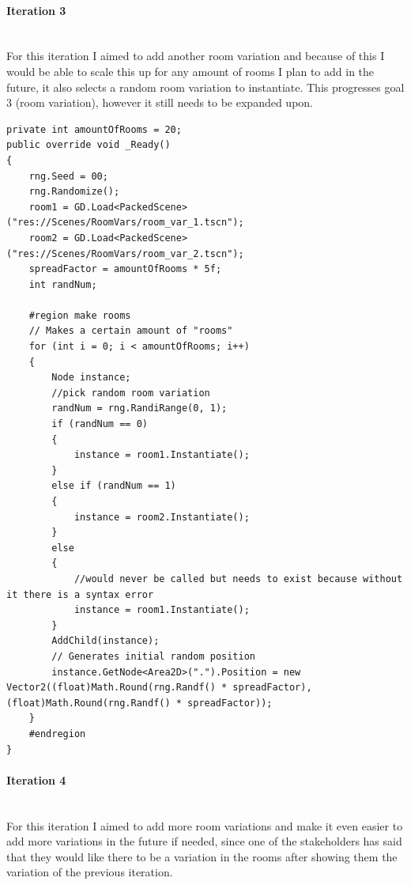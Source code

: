 \documentclass{article}
\newcommand{\parBr}{\vspace{5mm}}%
\newcommand{\myparagraph}[1]{\paragraph{#1}\mbox{}\\} %
\begin{document}
\myparagraph{Iteration 3}
For this iteration I aimed to add another room variation and because of this I would be able to scale this up for any amount of rooms I plan to add in the future, it also selects a random room variation to instantiate. This progresses goal 3 (room variation), however it still needs to be expanded upon.
\begin{lstlisting}
private int amountOfRooms = 20;
public override void _Ready()
{
    rng.Seed = 00;
    rng.Randomize();  
    room1 = GD.Load<PackedScene>("res://Scenes/RoomVars/room_var_1.tscn");
    room2 = GD.Load<PackedScene>("res://Scenes/RoomVars/room_var_2.tscn");
    spreadFactor = amountOfRooms * 5f;
    int randNum;
    
    #region make rooms
    // Makes a certain amount of "rooms"
    for (int i = 0; i < amountOfRooms; i++)
    {
        Node instance;
        //pick random room variation
        randNum = rng.RandiRange(0, 1);
        if (randNum == 0)
        {
            instance = room1.Instantiate();
        }
        else if (randNum == 1)
        {
            instance = room2.Instantiate();
        }
        else
        {
        	//would never be called but needs to exist because without it there is a syntax error
            instance = room1.Instantiate();
        }
        AddChild(instance);
        // Generates initial random position
        instance.GetNode<Area2D>(".").Position = new Vector2((float)Math.Round(rng.Randf() * spreadFactor), (float)Math.Round(rng.Randf() * spreadFactor)); 
    }
    #endregion
}
\end{lstlisting}

\myparagraph{Iteration 4}
For this iteration I aimed to add more room variations and make it even easier to add more variations in the future if needed, since one of the stakeholders has said that they would like there to be a variation in the rooms after showing them the variation of the previous iteration.

\parBr
\end{document}
